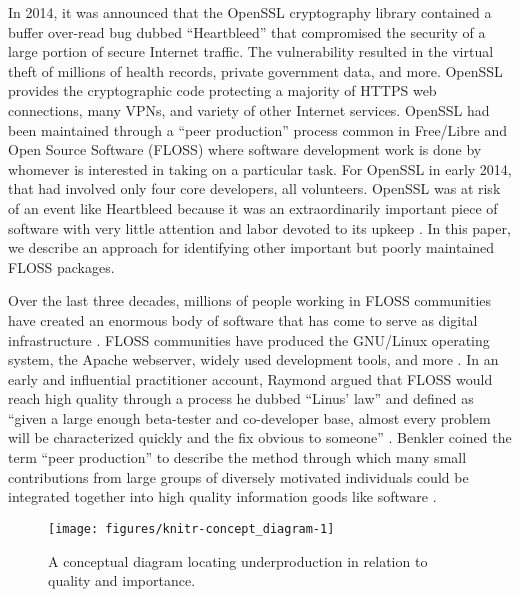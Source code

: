 \documentclass[10pt,conference]{IEEEtran}\usepackage[]{graphicx}\usepackage[usenames,dvipsnames]{color}
\newenvironment{knitrout}{}{} %
\begin{document}
In 2014, it was announced that the OpenSSL cryptography library contained a buffer over-read bug dubbed ``Heartbleed'' that compromised the security of a large portion of secure Internet traffic. The vulnerability resulted in the virtual theft of millions of health records, private government data, and more. OpenSSL provides the cryptographic code protecting a majority of HTTPS web connections, many VPNs, and variety of other Internet services. OpenSSL had been maintained through a ``peer production'' process common in Free/Libre and Open Source Software (FLOSS) where software development work is done by whomever is interested in taking on a particular task. For OpenSSL in early 2014, that had involved only four core developers, all volunteers. OpenSSL was at risk of an event like Heartbleed because it was an extraordinarily important piece of software with very little attention and labor devoted to its upkeep \cite{walden_impact_2020,eghbal_roads_2016}. In this paper, we describe an approach for identifying other important but poorly maintained FLOSS packages.

Over the last three decades, millions of people working in FLOSS communities have created an enormous body of software that has come to serve as digital infrastructure \cite{asay_real_2019}.
FLOSS communities have produced the GNU/Linux operating system, the Apache webserver, widely used development tools, and more \cite{crowston_free/libre_2012}.
In an early and influential practitioner account, Raymond argued that FLOSS would reach high quality through a process he dubbed ``Linus' law''
and defined as ``given a large enough beta-tester and co-developer base, almost every problem will be characterized quickly and the fix obvious to someone'' \cite{raymond_cathedral_1999}.
Benkler coined the term ``peer production'' to describe the method through which many small contributions from large groups of diversely motivated individuals could be integrated together into high quality information goods like software \cite{benkler_coases_2002}.


\begin{figure}
\centering
\begin{knitrout}
\color{fgcolor}
\texttt{[image: figures/knitr-concept\_diagram-1]} 

\end{knitrout}
\caption{A conceptual diagram locating underproduction in relation to quality and importance. }
\label{fig:simAlign}
\end{figure} 
\end{document}
